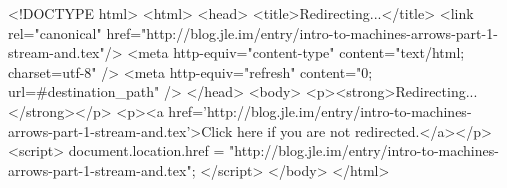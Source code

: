 <!DOCTYPE html>
<html>
<head>
<title>Redirecting...</title>
<link rel="canonical" href="http://blog.jle.im/entry/intro-to-machines-arrows-part-1-stream-and.tex"/>
<meta http-equiv="content-type" content="text/html; charset=utf-8" />
<meta http-equiv="refresh" content="0; url=#{destination_path}" />
</head>
<body>
  <p><strong>Redirecting...</strong></p>
  <p><a href='http://blog.jle.im/entry/intro-to-machines-arrows-part-1-stream-and.tex'>Click here if you are not redirected.</a></p>
  <script>
    document.location.href = "http://blog.jle.im/entry/intro-to-machines-arrows-part-1-stream-and.tex";
  </script>
</body>
</html>
